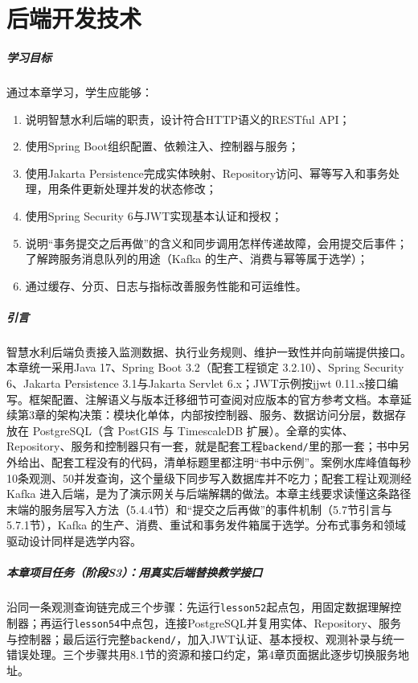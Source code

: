 \chapter{后端开发技术}

\paragraph*{学习目标}

通过本章学习，学生应能够：
\begin{enumerate}
\item 说明智慧水利后端的职责，设计符合HTTP语义的RESTful API；
\item 使用Spring Boot组织配置、依赖注入、控制器与服务；
\item 使用Jakarta Persistence完成实体映射、Repository访问、幂等写入和事务处理，用条件更新处理并发的状态修改；
\item 使用Spring Security 6与JWT实现基本认证和授权；
\item 说明“事务提交之后再做”的含义和同步调用怎样传递故障，会用提交后事件；了解跨服务消息队列的用途（Kafka 的生产、消费与幂等属于选学）；
\item 通过缓存、分页、日志与指标改善服务性能和可运维性。
\end{enumerate}

\paragraph*{引言}

智慧水利后端负责接入监测数据、执行业务规则、维护一致性并向前端提供接口。本章统一采用Java 17、Spring Boot 3.2（配套工程锁定 3.2.10）、Spring Security 6、Jakarta Persistence 3.1与Jakarta Servlet 6.x；JWT示例按jjwt 0.11.x接口编写。框架配置、注解语义与版本迁移细节可查阅对应版本的官方参考文档\cite{springBootDocs,springSecurityDocs,jakartaPersistence}。本章延续第3章的架构决策：模块化单体，内部按控制器、服务、数据访问分层，数据存放在 PostgreSQL（含 PostGIS 与 TimescaleDB 扩展）。全章的实体、Repository、服务和控制器只有一套，就是配套工程\texttt{backend/}里的那一套；书中另外给出、配套工程没有的代码，清单标题里都注明“书中示例”。案例水库峰值每秒10条观测、50并发查询，这个量级下同步写入数据库并不吃力；配套工程让观测经 Kafka 进入后端，是为了演示网关与后端解耦的做法。本章主线要求读懂这条路径末端的服务层写入方法（5.4.4节）和“提交之后再做”的事件机制（5.7节引言与5.7.1节），Kafka 的生产、消费、重试和事务发件箱属于选学。分布式事务和领域驱动设计同样是选学内容。

\begin{tipbox}
\paragraph{本章项目任务（阶段S3）：用真实后端替换教学接口}沿同一条观测查询链完成三个步骤：先运行\texttt{lesson52}起点包，用固定数据理解控制器；再运行\texttt{lesson54}中点包，连接PostgreSQL并复用实体、Repository、服务与控制器；最后运行完整\texttt{backend/}，加入JWT认证、基本授权、观测补录与统一错误处理。三个步骤共用8.1节的资源和接口约定，第4章页面据此逐步切换服务地址。

\end{tipbox}

